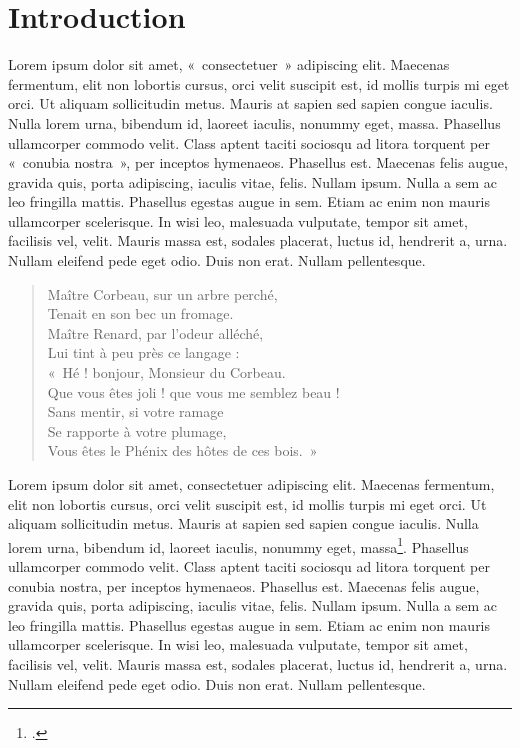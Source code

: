\chapter*{Introduction}

Lorem ipsum dolor sit amet, «~consectetuer~» adipiscing elit. Maecenas fermentum, elit non lobortis cursus, orci velit suscipit est, id mollis turpis mi eget orci. Ut aliquam sollicitudin metus. Mauris at sapien sed sapien congue iaculis. Nulla lorem urna, bibendum id, laoreet iaculis, nonummy eget, massa. Phasellus ullamcorper commodo velit. Class aptent taciti sociosqu ad litora torquent per «~conubia nostra~», per inceptos hymenaeos. Phasellus est. Maecenas felis augue, gravida quis, porta adipiscing, iaculis vitae, felis. Nullam ipsum. Nulla a sem ac leo fringilla mattis. Phasellus egestas augue in sem. Etiam ac enim non mauris ullamcorper scelerisque. In wisi leo, malesuada vulputate, tempor sit amet, facilisis vel, velit. Mauris massa est, sodales placerat, luctus id, hendrerit a, urna. Nullam eleifend pede eget odio. Duis non erat. Nullam pellentesque.

\begin{verse}
Maître Corbeau, sur un arbre perché, \\
Tenait en son bec un fromage. \\
Maître Renard, par l'odeur alléché, \\
Lui tint à peu près ce langage : \\
«~Hé ! bonjour, Monsieur du Corbeau. \\
Que vous êtes joli ! que vous me semblez beau ! \\
Sans mentir, si votre ramage \\
Se rapporte à votre plumage, \\
Vous êtes le Phénix des hôtes de ces bois.~» \\
\end{verse}

Lorem ipsum dolor sit amet, consectetuer adipiscing elit. Maecenas fermentum, elit non lobortis cursus, orci velit suscipit est, id mollis turpis mi eget orci. Ut aliquam sollicitudin metus. Mauris at sapien sed sapien congue iaculis. Nulla lorem urna, bibendum id, laoreet iaculis, nonummy eget, massa\footcite[32]{Pierre1901}. Phasellus ullamcorper commodo velit. Class aptent taciti sociosqu ad litora torquent per conubia nostra, per inceptos hymenaeos. Phasellus est. Maecenas felis augue, gravida quis, porta adipiscing, iaculis vitae, felis. Nullam ipsum. Nulla a sem ac leo fringilla mattis. Phasellus egestas augue in sem. Etiam ac enim non mauris ullamcorper scelerisque. In wisi leo, malesuada vulputate, tempor sit amet, facilisis vel, velit. Mauris massa est, sodales placerat, luctus id, hendrerit a, urna. Nullam eleifend pede eget odio. Duis non erat. Nullam pellentesque. 

